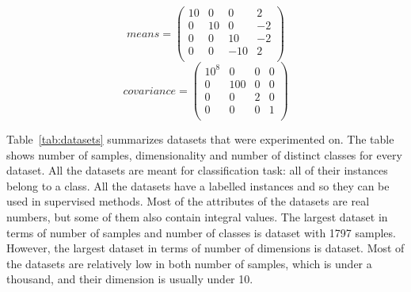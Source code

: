 \begin{equation} \label{eq:gauss:means}
means = \begin{pmatrix}
10 & 0 & 0 & 2 \\
0 & 10 & 0 & -2 \\
0 & 0 & 10 & -2 \\
0 & 0 & -10 & 2 \\
\end{pmatrix}
\end{equation}
\begin{equation} \label{eq:gauss:cov}
covariance = \begin{pmatrix}
10^8 & 0 & 0 & 0 \\
0 & 100 & 0 & 0 \\
0 & 0 & 2 & 0 \\
0 & 0 & 0 & 1 \\
\end{pmatrix}
\end{equation}

Table~\ref{tab:datasets} summarizes datasets that were experimented on. The table shows number of samples, dimensionality and number of distinct classes for every dataset. All the datasets are meant for classification task: all of their instances belong to a class. All the datasets have a labelled instances and so they can be used in supervised methods. Most of the attributes of the datasets are real numbers, but some of them also contain integral values. The largest dataset in terms of number of samples and number of classes is  dataset with 1797 samples. However, the largest dataset in terms of number of dimensions is  dataset. Most of the datasets are relatively low in both number of samples, which is under a thousand, and their dimension is usually under 10.

